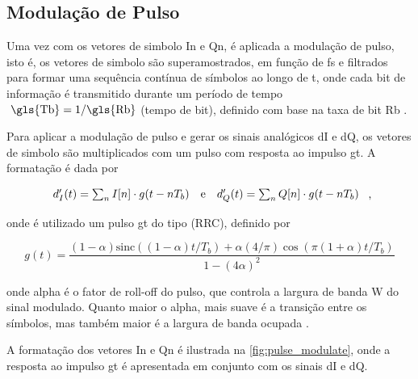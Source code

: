 \subsection{Modulação de Pulso}\label{sec:pulse_modulation}

Uma vez com os vetores de simbolo \gls{In} e \gls{Qn}, é aplicada a modulação de pulso, isto é, os vetores de simbolo são superamostrados, em função de \gls{fs} e filtrados para formar uma sequência contínua de símbolos ao longo de \gls{t}, onde cada bit de informação é transmitido durante um período de tempo $\text{ \gls{Tb}} = 1/ \text{\gls{Rb}}$ (tempo de bit), definido com base na taxa de bit \gls{Rb} \cite{cnes_services_and_message_formats_ed2_rev2_2006}.


Para aplicar a modulação de pulso e gerar os sinais analógicos \gls{dI} e \gls{dQ}, os vetores de simbolo são multiplicados com um pulso com resposta ao impulso \gls{gt}. A formatação é dada por 

\vspace{-1em}
\begin{equation}
    \begin{array}{c@{\quad\text{e}\quad}c}
        d_I'(t) = \sum_{n} I[n] \cdot g(t - nT_b) &
        d_Q'(t) = \sum_{n} Q[n] \cdot g(t - nT_b)
    \end{array} \text{ ,}
\end{equation}

\noindent onde é utilizado um pulso \gls{gt} do tipo (\gls{RRC}), definido por

\begin{equation}
    g(t) = \frac{(1-\alpha) \text{sinc}((1- \alpha) t / T_b) + \alpha(4/\pi) \cos(\pi(1 + \alpha)t/T_b) }{1 - (4\alpha )^2}
\end{equation}

\noindent onde \gls{alpha} é o fator de roll-off do pulso, que controla a largura de banda \gls{W} do sinal modulado. Quanto maior o \gls{alpha}, mais suave é a transição entre os símbolos, mas também maior é a largura de banda ocupada \cite{10555531840}.

A formatação dos vetores \gls{In} e \gls{Qn} é ilustrada na \autoref{fig:pulse_modulate}, onde a resposta ao impulso \gls{gt} é apresentada em conjunto com os sinais \gls{dI} e \gls{dQ}. 

